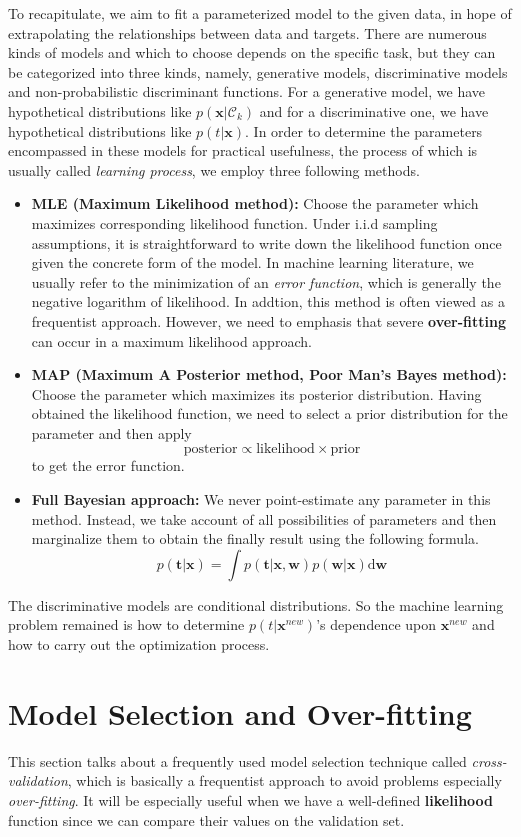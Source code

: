 \documentclass[a4paper]{book}
\newcommand{\ud}{\mathrm{d}}
\renewcommand{\bf}{\mathbf}
\renewcommand{\cal}{\mathcal}
\newcommand{\imp}[1]{\textit{#1}}
\begin{document}
To recapitulate, we aim to fit a parameterized model to the given data, in hope of extrapolating the relationships between data and targets. There are numerous kinds of models and which to choose depends on the specific task, but they can be categorized into three kinds, namely, generative models, discriminative models and non-probabilistic discriminant functions. For a generative model, we have hypothetical distributions like $p(\bf{x}|\cal{C}_k)$ and for a discriminative one, we have hypothetical distributions like $p(t|\bf{x})$. In order to determine the parameters encompassed in these models for practical usefulness, the process of which is usually called \imp{learning process}, we employ three following methods.
\begin{itemize}
\item \textbf{MLE (Maximum Likelihood method):} Choose the parameter which maximizes corresponding likelihood function. Under i.i.d sampling assumptions, it is straightforward to write down the likelihood function once given the concrete form of the model. In machine learning literature, we usually refer to the minimization of an \imp{error function}, which is generally the negative logarithm of likelihood. In addtion, this method is often viewed as a frequentist approach. However, we need to emphasis that severe \textbf{over-fitting} can occur in a maximum likelihood approach.\\
\item \textbf{MAP (Maximum A Posterior method, Poor Man's Bayes method):} Choose the parameter which maximizes its posterior distribution. Having obtained the likelihood function, we need to select a prior distribution for the parameter and then apply
\[
	\text{posterior} \propto \text{likelihood} \times \text{prior}
\]
to get the error function.\\
\item \textbf{Full Bayesian approach:} We never point-estimate any parameter in this method. Instead, we take account of all possibilities of parameters and then marginalize them to obtain the finally result using the following formula.
\[
	p(\bf{t}|\bf{x}) = \int p(\bf{t}|\bf{x},\bf{w}) p(\bf{w}|\bf{x}) \ud \bf{w}
\]
\end{itemize}
The discriminative models are conditional distributions. So the machine learning problem remained is how to determine $p(t|\bf{x}^{new})$'s dependence upon $\bf{x}^{new}$ and how to carry out the optimization process. 

\section{Model Selection and Over-fitting}
This section talks about a frequently used model selection technique called \imp{cross-validation}, which is basically a frequentist approach to avoid problems especially \textit{over-fitting}. It will be especially useful when we have a well-defined \textbf{likelihood} function since we can compare their values on the validation set.
\end{document}
